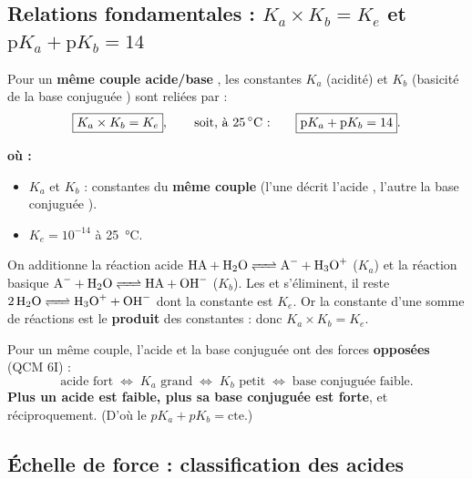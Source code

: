 \documentclass[11pt,a4paper]{article}
\newenvironment{ou}{%
  \par\smallskip\noindent\textbf{où :}\nopagebreak
  \begin{itemize}[leftmargin=1.8em,topsep=2pt,itemsep=1.5pt,parsep=0pt]}%
  {\end{itemize}}
\begin{document}
\subsection{Relations fondamentales : $K_a \times K_b = K_e$ et $\mathrm{p}K_a + \mathrm{p}K_b = 14$}

\begin{theoreme}
Pour un \textbf{même couple acide/base }, les constantes $K_a$ (acidité) et $K_b$ (basicité de la
base conjuguée ) sont reliées par :
\[ \boxed{K_a \times K_b = K_e}, \qquad\text{soit, à \SI{25}{\celsius} :}\qquad \boxed{\mathrm{p}K_a + \mathrm{p}K_b = 14}. \]
\end{theoreme}

\begin{ou}
\item $K_a$ et $K_b$ : constantes du \textbf{même couple} (l'une décrit l'acide , l'autre la base
      conjuguée ).
\item $K_e = 10^{-14}$ à \SI{25}{\celsius}.
\end{ou}

\begin{methode}
On additionne la réaction acide $\ce{HA + H2O <=> A- + H3O+}$ ($K_a$) et la réaction basique
$\ce{A- + H2O <=> HA + OH-}$ ($K_b$). Les  et  s'éliminent, il reste $\ce{2 H2O <=> H3O+ + OH-}$
dont la constante est $K_e$. Or la constante d'une somme de réactions est le \textbf{produit} des constantes :
donc $K_a \times K_b = K_e$.
\end{methode}

\begin{regle}
Pour un même couple, l'acide et la base conjuguée ont des forces \textbf{opposées} (QCM 6I) :
\[ \text{acide fort} \;\Longleftrightarrow\; K_a \text{ grand} \;\Longleftrightarrow\; K_b \text{ petit}
   \;\Longleftrightarrow\; \text{base conjuguée faible}. \]
\textbf{Plus un acide est faible, plus sa base conjuguée est forte}, et réciproquement. (D'où le $pK_a + pK_b
= \text{cte}$.)
\end{regle}

\subsection{Échelle de force : classification des acides}
\end{document}
